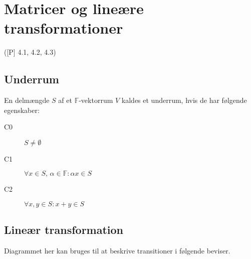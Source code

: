 \newpage
\chapter{Matricer og lineære transformationer}
([P] 4.1, 4.2, 4.3)

\section{Underrum}
En delmængde $S$ af et $\mathbb{F}$-vektorrum $V$ kaldes et underrum, hvis de
har følgende egenskaber:
\begin{description}
	\item[C0] $S \not= \emptyset$
	\item[C1] $\forall x \in S, \, \alpha \in \mathbb{F} \colon \alpha x \in S$
	\item[C2] $\forall x,y \in S \colon x + y \in S$
\end{description}

\section{Lineær transformation}




Diagrammet her kan bruges til at beskrive transitioner i følgende
beviser.
\begin{center}

\end{center}



